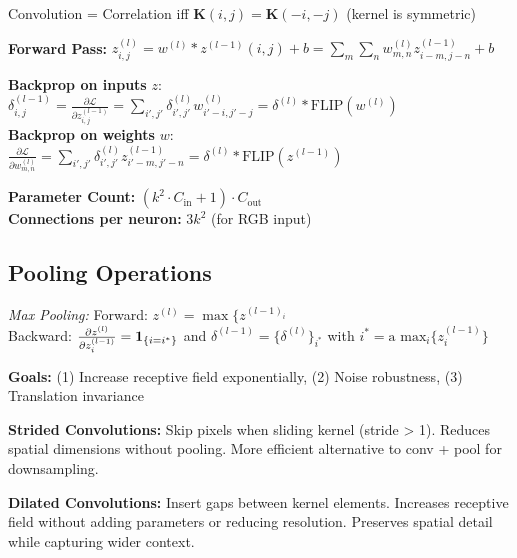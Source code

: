 \begin{highlightbox*}[gray!30]
Convolution = Correlation iff $\mathbf{K}(i,j) = \mathbf{K}(-i,-j)$ (kernel is symmetric)
\end{highlightbox*}



\textbf{Forward Pass:} $z_{i,j}^{(l)} = w^{(l)} * z^{(l-1)}(i,j) + b = \sum_m \sum_n w_{m,n}^{(l)} z_{i-m,j-n}^{(l-1)} + b$

{\small
\textbf{Backprop on inputs} $z$: $\delta_{i,j}^{(l-1)} = \frac{\partial \mathcal{L}}{\partial z_{i,j}^{(l-1)}} = \sum_{i',j'} \delta_{i',j'}^{(l)} w_{i'-i,j'-j}^{(l)} = \delta^{(l)} * \text{FLIP}(w^{(l)})$\\
\textbf{Backprop on weights} $w$: $\frac{\partial \mathcal{L}}{\partial w_{m,n}^{(l)}} = \sum_{i',j'} \delta_{i',j'}^{(l)} z_{i'-m,j'-n}^{(l-1)} = \delta^{(l)} * \text{FLIP}(z^{(l-1)})$
}


\textbf{Parameter Count:} $(k^2 \cdot C_{\text{in}} + 1) \cdot C_{\text{out}}$\\
\textbf{Connections per neuron:} $3k^2$ (for RGB input)


\subsection{Pooling Operations}

\emph{Max Pooling:} 
Forward: $z^{(l)} = \max\{z^{(l-1)_i}$\\
Backward: $\frac{\partial z^{(l)}}{\partial z^{(l-1)}_i} = \mathbf{1}_{\{i = i^*\}}$ and
$\delta^{(l-1)}=\{ \delta^{(l)}\}_{i^*}$ with {\small $i^* = \text{a max}_i\{ z^{(l-1)}_i \}$}

\textbf{Goals:} (1) Increase receptive field exponentially, (2) Noise robustness, (3) Translation invariance

\textbf{Strided Convolutions:} Skip pixels when sliding kernel (stride > 1). Reduces spatial dimensions without pooling. More efficient alternative to conv + pool for downsampling.

\textbf{Dilated Convolutions:} Insert gaps between kernel elements. Increases receptive field without adding parameters or reducing resolution. Preserves spatial detail while capturing wider context.

